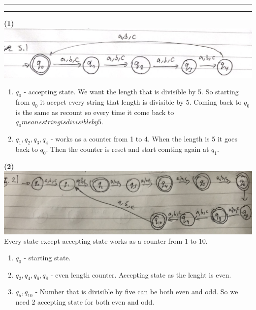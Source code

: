 \documentclass[a4paper, 11pt]{article}
\newcommand{\question}[2] {\vspace{.25in} \hrule\vspace{0.5em}
\noindent{\bf #1: #2} \vspace{0.5em}
\hrule \vspace{.10in}}
\renewcommand{\part}[1] {\vspace{.10in} {\bf (#1)}}
\begin{document}
 \question{5}{Basic DFAs}
 \part{1}\\
 \includegraphics[width=\textwidth]{Q5-1.png}\\
 \begin{enumerate}
 	\item $q_0$ - accepting state. We want the length that is divisible by 5. So starting from $q_0$ it accpet every string that length is divisible by 5. Coming back to $q_0$ is the same as recount so every time it come back to $q_0 means string is divisible by 5$.
 	\item $q_1,q_2,q_3,q_4$ - works as a counter from 1 to 4.  When the length is 5 it goes back to $q_0$. Then the counter is reset and start comting again at $q_1$. 
 \end{enumerate}

\part{2}\\
\includegraphics[width=\textwidth]{Q5-2.png}\\
Every state except accepting state works as a counter from 1 to 10.\\
\begin{enumerate}
	\item $q_0$ - starting state.
	\item $q_2, q_4, q_6, q_8$ - even length counter. Accepting state as the lenght is even.
	\item $q_5,q_10$ - Number that is divisible by five can be both even and odd. So we need 2 accepting state for both even and odd.
\end{enumerate}
\end{document}

